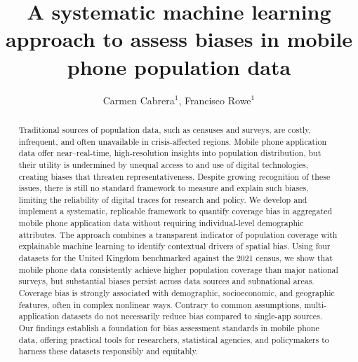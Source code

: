 \documentclass[]{rsos}%
\begin{document}
\title{A systematic machine learning approach to assess biases in mobile phone population data}

\author{
Carmen Cabrera$^{1}$,
Francisco Rowe$^{1}$}

\address{
  $^{1}$Geographic Data Science Lab, Department of Geography and Planning, University of Liverpool, Liverpool, United Kingdom.\\
  $^{}$}
\subject{
Mobile phone data,
Human mobility,
Explainable AI,
Spatial analysis}



\begin{abstract}
Traditional sources of population data, such as censuses and surveys, are costly, infrequent, and often unavailable in crisis-affected regions. Mobile phone application data offer near--real-time, high-resolution insights into population distribution, but their utility is undermined by unequal access to and use of digital technologies, creating biases that threaten representativeness. Despite growing recognition of these issues, there is still no standard framework to measure and explain such biases, limiting the reliability of digital traces for research and policy. We develop and implement a systematic, replicable framework to quantify coverage bias in aggregated mobile phone application data without requiring individual-level demographic attributes. The approach combines a transparent indicator of population coverage with explainable machine learning to identify contextual drivers of spatial bias. Using four datasets for the United Kingdom benchmarked against the 2021 census, we show that mobile phone data consistently achieve higher population coverage than major national surveys, but substantial biases persist across data sources and subnational areas. Coverage bias is strongly associated with demographic, socioeconomic, and geographic features, often in complex nonlinear ways. Contrary to common assumptions, multi-application datasets do not necessarily reduce bias compared to single-app sources. Our findings establish a foundation for bias assessment standards in mobile phone data, offering practical tools for researchers, statistical agencies, and policymakers to harness these datasets responsibly and equitably.
\end{abstract}
\end{document}
